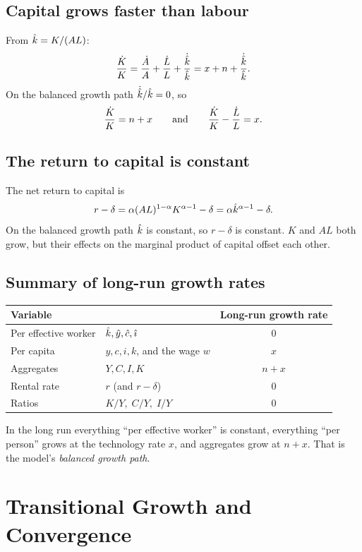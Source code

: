 \documentclass[11pt]{article}
\begin{document}
\subsection{Capital grows faster than labour}
From $\hat{k} = K/(AL)$:
\[
\frac{\dot{K}}{K} = \frac{\dot{A}}{A} + \frac{\dot{L}}{L} + \frac{\dot{\hat{k}}}{\hat{k}} = x + n + \frac{\dot{\hat{k}}}{\hat{k}}.
\]
On the balanced growth path $\dot{\hat{k}}/\hat{k} = 0$, so
\[
\frac{\dot{K}}{K} = n + x \qquad\text{and}\qquad \frac{\dot{K}}{K} - \frac{\dot{L}}{L} = x.
\]

\subsection{The return to capital is constant}
The net return to capital is
\[
r - \delta = \alpha(AL)^{1-\alpha}K^{\alpha-1} - \delta = \alpha\hat{k}^{\alpha-1} - \delta.
\]
On the balanced growth path $\hat{k}$ is constant, so $r - \delta$ is constant. $K$ and $AL$ both grow, but their effects on the marginal product of capital offset each other.

\subsection{Summary of long-run growth rates}
\begin{center}
\renewcommand{\arraystretch}{1.25}
\begin{tabular}{@{}llc@{}}
\toprule
Variable & & Long-run growth rate \\
\midrule
Per effective worker & $\hat{k}, \hat{y}, \hat{c}, \hat{\imath}$ & $0$ \\
Per capita & $y, c, i, k$, and the wage $w$ & $x$ \\
Aggregates & $Y, C, I, K$ & $n + x$ \\
Rental rate & $r$ (and $r - \delta$) & $0$ \\
Ratios & $K/Y,\; C/Y,\; I/Y$ & $0$ \\
\bottomrule
\end{tabular}
\end{center}

\begin{recap}
In the long run everything ``per effective worker'' is constant, everything ``per person'' grows at the technology rate $x$, and aggregates grow at $n + x$. That is the model's \emph{balanced growth path}.
\end{recap}

\section{Transitional Growth and Convergence}
\end{document}
